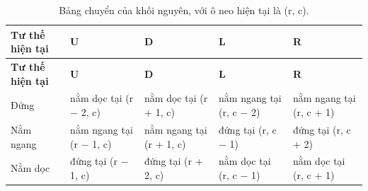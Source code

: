 \begin{longtable}[]{@{}
  >{\raggedright\arraybackslash}p{}
  >{\raggedright\arraybackslash}p{}
  >{\raggedright\arraybackslash}p{}
  >{\raggedright\arraybackslash}p{}
  >{\raggedright\arraybackslash}p{}@{}}
\caption{ Bảng chuyển của khối nguyên, với ô neo hiện tại là (r, c).}\tabularnewline
\toprule\noalign{}
\rowcolor{tablehead}\begin{minipage}[b]{\linewidth}\raggedright
\textbf{Tư thế hiện tại}
\end{minipage} & \begin{minipage}[b]{\linewidth}\raggedright
\textbf{U}
\end{minipage} & \begin{minipage}[b]{\linewidth}\raggedright
\textbf{D}
\end{minipage} & \begin{minipage}[b]{\linewidth}\raggedright
\textbf{L}
\end{minipage} & \begin{minipage}[b]{\linewidth}\raggedright
\textbf{R}
\end{minipage} \\
\midrule\noalign{}
\endfirsthead
\toprule\noalign{}
\rowcolor{tablehead}\begin{minipage}[b]{\linewidth}\raggedright
\textbf{Tư thế hiện tại}
\end{minipage} & \begin{minipage}[b]{\linewidth}\raggedright
\textbf{U}
\end{minipage} & \begin{minipage}[b]{\linewidth}\raggedright
\textbf{D}
\end{minipage} & \begin{minipage}[b]{\linewidth}\raggedright
\textbf{L}
\end{minipage} & \begin{minipage}[b]{\linewidth}\raggedright
\textbf{R}
\end{minipage} \\
\midrule\noalign{}
\endhead
\bottomrule\noalign{}
\endlastfoot
Đứng & nằm dọc tại (r − 2, c) & nằm dọc tại (r + 1, c) & nằm ngang tại (r, c − 2) & nằm ngang tại (r, c + 1) \\
\rowrule
Nằm ngang & nằm ngang tại (r − 1, c) & nằm ngang tại (r + 1, c) & đứng tại (r, c − 1) & đứng tại (r, c + 2) \\
\rowrule
Nằm dọc & đứng tại (r − 1, c) & đứng tại (r + 2, c) & nằm dọc tại (r, c − 1) & nằm dọc tại (r, c + 1) \\
\end{longtable}


